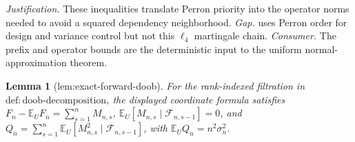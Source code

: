 \documentclass{article}
\newtheorem{lemma}{Lemma}
\begin{document}
\par\smallskip\noindent \textit{Justification.} These inequalities translate Perron priority into the operator norms needed to avoid a squared dependency neighborhood. \textit{Gap.} \cite{KandirosPipisDaskalakisHarshaw2024CGD} uses Perron order for design and variance control but not this \(\ell_4\) martingale chain. \textit{Consumer.} The prefix and operator bounds are the deterministic input to the uniform normal-approximation theorem.

\begin{lemma}[lem:exact-forward-doob]\label{lem:exact-forward-doob}
For the rank-indexed filtration in \(\mathrm{def:doob\text{-}decomposition}\), the displayed coordinate formula satisfies \(F_n-\mathbb E_UF_n=\sum_{s=1}^nM_{n,s}\), \(\mathbb E_U[M_{n,s}\mid\mathcal F_{n,s-1}]=0\), and \(Q_n=\sum_{s=1}^n\mathbb E_U[M_{n,s}^2\mid\mathcal F_{n,s-1}]\), with \(\mathbb E_UQ_n=n^2\sigma_n^2\).
\end{lemma}
\end{document}
